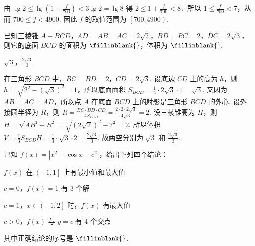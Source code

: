\begin{solution}
由 \( \lg 2\le \lg \left( 1+\frac{f}{700} \right)<3\lg 2=\lg 8 \)
得 \( 2\le 1+\frac{f}{700}<8 \)，所以 \( 1\le \frac{f}{700}<7 \)，从而 \( 700\le f<4900 \). 因此 \( f \) 的取值范围为 \( \left[ 700,4900 \right) \).
\end{solution}

\begin{problem}
已知三棱锥 \( A-BCD \)，\( AD=AB=AC=2\sqrt{2} \)，\( BD=BC=2 \)，\( DC=2\sqrt{3} \)，则它的底面 \(BCD\) 的面积为 \(\fillinblank{} \)，体积为 \(\fillinblank{} \).

\end{problem}

\begin{answer}
\(\sqrt{3}\)，\(\frac{2\sqrt{3}}{3}\)
\end{answer}

\begin{solution}
在三角形 \(BCD\) 中，\( BC=BD=2 \)，\( CD=2\sqrt{3} \). 设底边 \(CD\) 上的高为 \( h \)，则 \( h=\sqrt{2^2-\left( \sqrt{3} \right)^2}=1 \)，所以底面面积 \( S_{BCD}=\frac{1}{2}\cdot 2\sqrt{3}\cdot 1=\sqrt{3} \).
又因为 \( AB=AC=AD \)，所以点 \(A\) 在底面 \(BCD\) 上的射影是三角形 \(BCD\) 的外心. 设外接圆半径为 \(R\)，则 \( R=\frac{BC\cdot BD\cdot CD}{4S_{BCD}}=\frac{2\cdot 2\cdot 2\sqrt{3}}{4\sqrt{3}}=2 \).
设三棱锥高为 \(H\)，则 \( H=\sqrt{AB^2-R^2}=\sqrt{\left( 2\sqrt{2} \right)^2-2^2}=2 \). 所以体积 \( V=\frac{1}{3}S_{BCD}H=\frac{1}{3}\cdot \sqrt{3}\cdot 2=\frac{2\sqrt{3}}{3} \).
故两空分别为 \( \sqrt{3} \) 和 \( \frac{2\sqrt{3}}{3} \).
\end{solution}

\begin{problem}
已知 \( f(x)=\left| x^2-\cos x-c^2 \right| \)，给出下列四个结论：

\begin{circlelist}
\item \( f(x) \) 在 \( \left( -1,1 \right] \) 上有最小值和最大值
\item \( c=0 \)，\( f(x)=1 \) 有 3 个解
\item \( c=1 \)，\( x\in \left( -1,2 \right] \) 时，\( f(x) \) 有最大值
\item \( c>0 \)，\( f(x) \) 与 \( y=c \) 有 4 个交点
\end{circlelist}

其中正确结论的序号是 \(\fillinblank{} \).
\end{problem}

